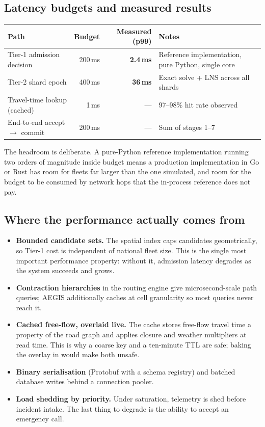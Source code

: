 \subsection{Latency budgets and measured results}

\begin{center}\footnotesize
\begin{tabular}{@{}lrrl@{}}
\toprule
\textbf{Path} & \textbf{Budget} & \textbf{Measured (p99)} & \textbf{Notes} \\
\midrule
Tier-1 admission decision & 200\,ms & \textbf{2.4\,ms} & Reference implementation, pure Python, single core \\
Tier-2 shard epoch & 400\,ms & \textbf{36\,ms} & Exact solve + LNS across all shards \\
Travel-time lookup (cached) & 1\,ms & --- & 97--98\% hit rate observed \\
End-to-end accept $\rightarrow$ commit & 200\,ms & --- & Sum of stages 1--7 \\
\bottomrule
\end{tabular}
\end{center}

\noindent The headroom is deliberate. A pure-Python reference implementation
running two orders of magnitude inside budget means a production
implementation in Go or Rust has room for fleets far larger than the one
simulated, and room for the budget to be consumed by network hops that the
in-process reference does not pay.

\subsection{Where the performance actually comes from}

\begin{itemize}
\item \textbf{Bounded candidate sets.} The spatial index caps candidates
      geometrically, so Tier-1 cost is independent of national fleet size.
      This is the single most important performance property: without it,
      admission latency degrades as the system succeeds and grows.
\item \textbf{Contraction hierarchies} in the routing engine give
      microsecond-scale path queries; AEGIS additionally caches at cell
      granularity so most queries never reach it.
\item \textbf{Cached free-flow, overlaid live.} The cache stores free-flow
      travel time \textemdash{} a property of the road graph \textemdash{} and
      applies closure and weather multipliers at read time. This is why a
      coarse key and a ten-minute TTL are safe; baking the overlay in would
      make both unsafe.
\item \textbf{Binary serialisation} (Protobuf with a schema registry) and
      batched database writes behind a connection pooler.
\item \textbf{Load shedding by priority.} Under saturation, telemetry is shed
      before incident intake. The last thing to degrade is the ability to
      accept an emergency call.
\end{itemize}

